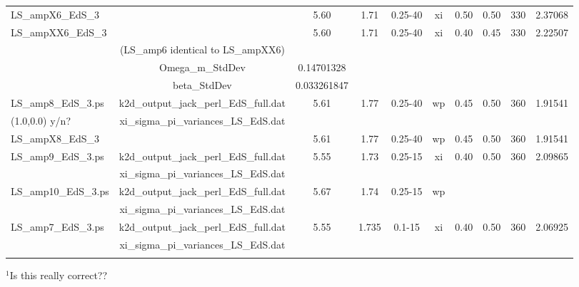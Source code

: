 \documentclass[usenatbib]{mn2e}
\begin{document}
\begin{table*}
\begin{center}
\begin{tabular}{lccccccccc}
LS\_ampX6\_EdS\_3    &                                         &  5.60	      & 1.71  & 0.25-40 &  xi  & 0.50  & 0.50  & 330  & 2.37068 \\
LS\_ampXX6\_EdS\_3   & 	                                       &  5.60	      & 1.71  & 0.25-40 &  xi  & 0.40  & 0.45  & 330  & 2.22507 \\
                     & (LS\_amp6 identical to LS\_ampXX6)      &              &       &         &      &       &       &      & \\
		     & Omega\_m\_StdDev                        &  0.14701328  &       &         &      &       &       &      & \\
		     & beta\_StdDev                            &  0.033261847 &       &         &      &       &       &      & \\[8pt]
%
%
LS\_amp8\_EdS\_3.ps  & k2d\_output\_jack\_perl\_EdS\_full.dat  & 5.61         & 1.77  &  0.25-40 &  wp & 0.45  & 0.50  & 360  & 1.91541\\
(1.0,0.0) y/n?	     & xi\_sigma\_pi\_variances\_LS\_EdS.dat   &              &       &          &     &       &       &      & \\[8pt]
%	
LS\_ampX8\_EdS\_3    &                                         & 5.61         & 1.77  &  0.25-40 &  wp & 0.45  & 0.50  & 360  & 1.91541 \\[8pt]
%
%
LS\_amp9\_EdS\_3.ps  & k2d\_output\_jack\_perl\_EdS\_full.dat  & 5.55         & 1.73  &  0.25-15 &  xi & 0.40  & 0.50  & 360  & 2.09865\\
		     &   xi\_sigma\_pi\_variances\_LS\_EdS.dat &              &       &           &     &       &       &      & \\[8pt]
%
%
LS\_amp10\_EdS\_3.ps & k2d\_output\_jack\_perl\_EdS\_full.dat  & 5.67         & 1.74  & 0.25-15  &  wp &       &       &      & \\
		     & xi\_sigma\_pi\_variances\_LS\_EdS.dat   &              &       &          &     &       &       &      & \\[8pt]
%
%
LS\_amp7\_EdS\_3.ps  & k2d\_output\_jack\_perl\_EdS\_full.dat  & 5.55         & 1.735 &   0.1-15 &  xi &  0.40 & 0.50  & 360  &  2.06925 \\
		     & xi\_sigma\_pi\_variances\_LS\_EdS.dat   &              &       &          &     &       &       &      & \\[8pt]
\hline
\hline
\label{}
\end{tabular}
\end{center}
\end{table*}
$^1$Is this really correct??
\end{document}
